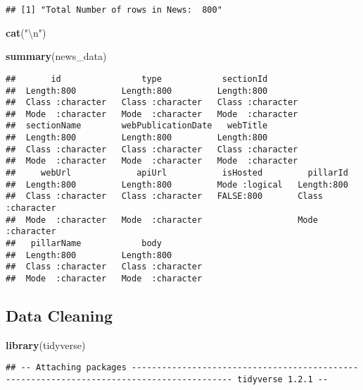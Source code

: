 \documentclass[]{article}
\newenvironment{Shaded}{\begin{snugshade}}{\end{snugshade}}
\newcommand{\KeywordTok}[1]{\textcolor[rgb]{0.13,0.29,0.53}{\textbf{#1}}}
\newcommand{\CharTok}[1]{\textcolor[rgb]{0.31,0.60,0.02}{#1}}
\newcommand{\StringTok}[1]{\textcolor[rgb]{0.31,0.60,0.02}{#1}}
\newcommand{\NormalTok}[1]{#1}
\begin{document}
\begin{verbatim}
## [1] "Total Number of rows in News:  800"
\end{verbatim}

\begin{Shaded}
\begin{Highlighting}[]
\KeywordTok{cat}\NormalTok{(}\StringTok{"}\CharTok{\textbackslash{}n}\StringTok{"}\NormalTok{)}
\end{Highlighting}
\end{Shaded}

\begin{Shaded}
\begin{Highlighting}[]
\KeywordTok{summary}\NormalTok{(news_data)}
\end{Highlighting}
\end{Shaded}

\begin{verbatim}
##       id                type            sectionId        
##  Length:800         Length:800         Length:800        
##  Class :character   Class :character   Class :character  
##  Mode  :character   Mode  :character   Mode  :character  
##  sectionName        webPublicationDate   webTitle        
##  Length:800         Length:800         Length:800        
##  Class :character   Class :character   Class :character  
##  Mode  :character   Mode  :character   Mode  :character  
##     webUrl             apiUrl           isHosted         pillarId        
##  Length:800         Length:800         Mode :logical   Length:800        
##  Class :character   Class :character   FALSE:800       Class :character  
##  Mode  :character   Mode  :character                   Mode  :character  
##   pillarName            body          
##  Length:800         Length:800        
##  Class :character   Class :character  
##  Mode  :character   Mode  :character
\end{verbatim}

\subsection{Data Cleaning}\label{data-cleaning}

\begin{Shaded}
\begin{Highlighting}[]
\KeywordTok{library}\NormalTok{(tidyverse)}
\end{Highlighting}
\end{Shaded}

\begin{verbatim}
## -- Attaching packages ------------------------------------------------------------------------------------------ tidyverse 1.2.1 --
\end{verbatim}
\end{document}
